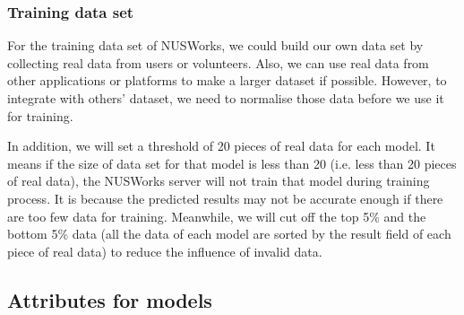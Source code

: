 \documentclass[fyp]{socreport}
\begin{document}
\subsubsection{Training data set}
For the training data set of NUSWorks, we could build our own data set by collecting real data from users or volunteers. Also, we can use real data from other applications or platforms to make a larger dataset if possible. However, to integrate with others’ dataset, we need to normalise those data before we use it for training.

In addition, we will set a threshold of 20 pieces of real data for each model. It means if the size of data set for that model is less than 20 (i.e. less than 20 pieces of real data), the NUSWorks server will not train that model during training process. It is because the predicted results may not be accurate enough if there are too few data for training. Meanwhile, we will cut off the top 5\% and the bottom 5\% data (all the data of each model are sorted by the result field of each piece of real data) to reduce the influence of invalid data.

\subsection{Attributes for models}
\end{document}

